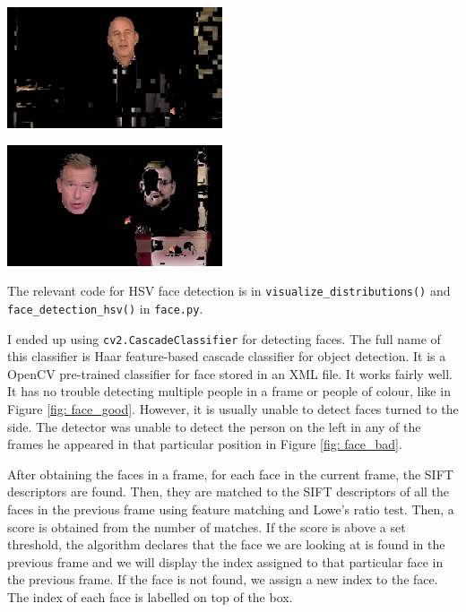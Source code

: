 \documentclass{article}
\begin{document}
\begin{minipage}{0.5\linewidth}
 \label{fig: hsv_good}
\centering
\includegraphics[width=2.5in]{../output/clip_1_hsv/160.jpg}
\end{minipage}
\begin{minipage}{0.5\linewidth}
 \label{fig: hsv_bad}
\centering
\includegraphics[width=2.5in]{../output/clip_1_hsv/050.jpg}
\end{minipage}
\vspace*{10pt}

The relevant code for HSV face detection is in \texttt{visualize\_distributions()} and \texttt{face\_detection\_hsv()} in \texttt{face.py}.

I ended up using \texttt{cv2.CascadeClassifier} for detecting faces. The full name of this classifier is Haar feature-based cascade classifier for object detection. It is a OpenCV pre-trained classifier for face stored in an XML file. It works fairly well. It has no trouble detecting multiple people in a frame or people of colour, like in Figure \ref{fig: face_good}. However, it is usually unable to detect faces turned to the side. The detector was unable to detect the person on the left in any of the frames he appeared in that particular position in Figure \ref{fig: face_bad}.

After obtaining the faces in a frame, for each face in the current frame, the SIFT descriptors are found. Then, they are matched to the SIFT descriptors of all the faces in the previous frame using feature matching and Lowe's ratio test. Then, a score is obtained from the number of matches. If the score is above a set threshold, the algorithm declares that the face we are looking at is found in the previous frame and we will display the index assigned to that particular face in the previous frame. If the face is not found, we assign a new index to the face. The index of each face is labelled on top of the box.
\end{document}
